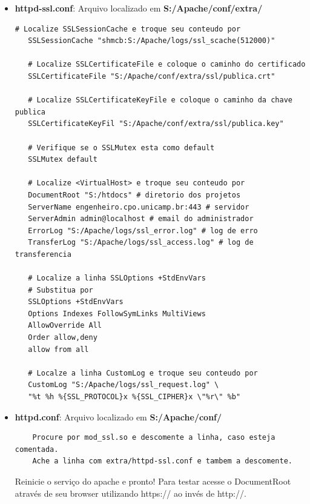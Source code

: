 \documentclass[a4paper,10pt]{article}
\begin{document}
\begin{itemize}
\item \textbf{httpd-ssl.conf}: Arquivo localizado em \textbf{S:/Apache/conf/extra/}
 \begin{lstlisting}[caption={httpd-ssl.conf}]
   # Localize SSLSessionCache e troque seu conteudo por
   SSLSessionCache "shmcb:S:/Apache/logs/ssl_scache(512000)" 

   # Localize SSLCertificateFile e coloque o caminho do certificado 
   SSLCertificateFile "S:/Apache/conf/extra/ssl/publica.crt" 

   # Localize SSLCertificateKeyFile e coloque o caminho da chave publica 
   SSLCertificateKeyFil "S:/Apache/conf/extra/ssl/publica.key" 

   # Verifique se o SSLMutex esta como default
   SSLMutex default

   # Localize <VirtualHost> e troque seu conteudo por
   DocumentRoot "S:/htdocs" # diretorio dos projetos
   ServerName engenheiro.cpo.unicamp.br:443 # servidor
   ServerAdmin admin@localhost # email do administrador
   ErrorLog "S:/Apache/logs/ssl_error.log" # log de erro
   TransferLog "S:/Apache/logs/ssl_access.log" # log de transferencia

   # Localize a linha SSLOptions +StdEnvVars
   # Substitua por
   SSLOptions +StdEnvVars
   Options Indexes FollowSymLinks MultiViews
   AllowOverride All
   Order allow,deny
   allow from all

   # Localze a linha CustomLog e troque seu conteudo por
   CustomLog "S:/Apache/logs/ssl_request.log" \ 
   "%t %h %{SSL_PROTOCOL}x %{SSL_CIPHER}x \"%r\" %b" 
 \end{lstlisting}
\item \textbf{httpd.conf}:  Arquivo localizado em \textbf{S:/Apache/conf/}
  \begin{lstlisting}
    Procure por mod_ssl.so e descomente a linha, caso esteja comentada.
    Ache a linha com extra/httpd-ssl.conf e tambem a descomente.
  \end{lstlisting}
Reinicie o serviço do apache e pronto! Para testar acesse o DocumentRoot através de seu browser utilizando https:// ao invés de http://.
\end{itemize}
\end{document}
